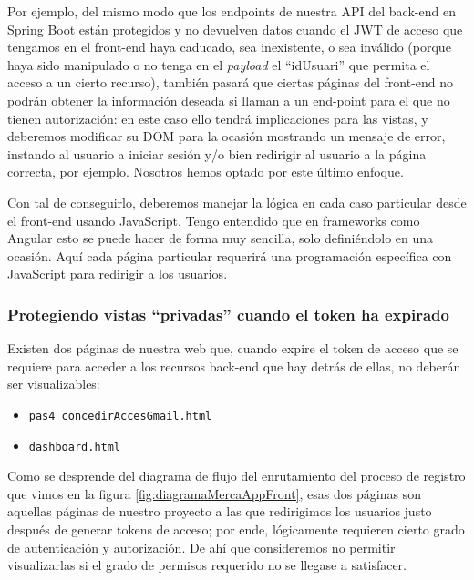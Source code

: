 \documentclass[a4paper,12pt]{report}
\begin{document}
	Por ejemplo, del mismo modo que los endpoints de nuestra API del back-end en Spring Boot están protegidos y no devuelven datos cuando el JWT de acceso que tengamos en el front-end haya caducado, sea inexistente, o sea inválido (porque haya sido manipulado o no tenga en el \textit{payload} el ``idUsuari'' que permita el acceso a un cierto recurso), también pasará que ciertas páginas del front-end no podrán obtener la información deseada si llaman a un end-point para el que no tienen autorización: en este caso ello tendrá implicaciones para las vistas, y deberemos modificar su DOM para la ocasión mostrando un mensaje de error, instando al usuario a iniciar sesión y/o bien redirigir al usuario a la página correcta, por ejemplo. Nosotros hemos optado por este último enfoque.
	
	Con tal de conseguirlo, deberemos manejar la lógica en cada caso particular desde el front-end usando JavaScript. Tengo entendido que en frameworks como Angular esto se puede hacer de forma muy sencilla, solo definiéndolo en una ocasión. Aquí cada página particular requerirá una programación específica con JavaScript para redirigir a los usuarios.
	
	\subsubsection{Protegiendo vistas ``privadas'' cuando el token ha expirado}
	
	Existen dos páginas de nuestra web que, cuando expire el token de acceso que se requiere para acceder a los recursos back-end que hay detrás de ellas, no deberán ser visualizables:
	
	\vspace{0em}
	\begin{itemize}
		\setlength{\itemsep}{-.5em}
		\item \texttt{pas4\_concedirAccesGmail.html}
		\item \texttt{dashboard.html}
	\end{itemize}
	
	Como se desprende del diagrama de flujo del enrutamiento del proceso de registro que vimos en la figura \ref{fig:diagramaMercaAppFront}, esas dos páginas son aquellas páginas de nuestro proyecto a las que redirigimos los usuarios justo después de generar tokens de acceso; por ende, lógicamente requieren cierto grado de autenticación y autorización. De ahí que consideremos no permitir visualizarlas si el grado de permisos requerido no se llegase a satisfacer.
	
\end{document}
